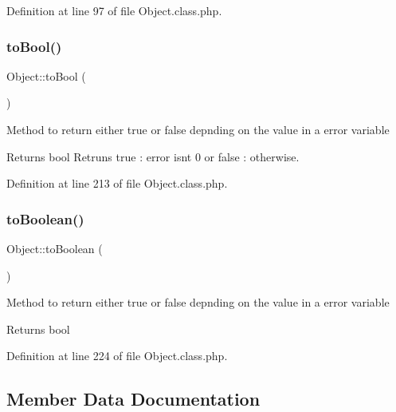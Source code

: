 Definition at line 97 of file Object.\+class.\+php.

\mbox{\label{classObject_a409216fd5ab386b1e78e311440113f75}} 
\subsubsection{\texorpdfstring{to\+Bool()}{toBool()}}
{\footnotesize\ttfamily Object\+::to\+Bool (\begin{DoxyParamCaption}{ }\end{DoxyParamCaption})}

Method to return either true or false depnding on the value in a \textquotesingle{}error\textquotesingle{} variable

\begin{DoxyReturn}{Returns}
bool Retruns true \+: error isn\textquotesingle{}t 0 or false \+: otherwise. 
\end{DoxyReturn}


Definition at line 213 of file Object.\+class.\+php.

\mbox{\label{classObject_afafb45098e163c179940c7e1ddc67fe2}} 
\subsubsection{\texorpdfstring{to\+Boolean()}{toBoolean()}}
{\footnotesize\ttfamily Object\+::to\+Boolean (\begin{DoxyParamCaption}{ }\end{DoxyParamCaption})}

Method to return either true or false depnding on the value in a \textquotesingle{}error\textquotesingle{} variable

\begin{DoxyReturn}{Returns}
bool 
\end{DoxyReturn}


Definition at line 224 of file Object.\+class.\+php.



\subsection{Member Data Documentation}
\mbox{\label{classObject_a891a586df36cca119a56bb509f582858}} 
